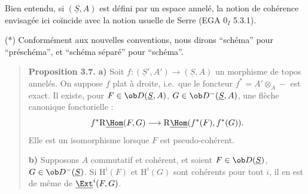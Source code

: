 Bien entendu, si $(\underline{S}, A)$ est défini par un espace annelé, la notion de cohérence envisagée ici coïncide avec la notion usuelle de Serre (EGA $0_I$ 5.3.1).

(*) Conformément aux nouvelles conventions, nous dirons ``schéma'' pour ``préschéma'', et ``schéma séparé'' pour ``schéma''.

\begin{quote}
\textbf{Proposition 3.7.} \textbf{a)} Soit $f : (\underline{S}', A') \to (\underline{S}, A)$ un morphisme de topos annelés. On suppose $f$ plat à droite, i.e.\ que le foncteur $f^* = A' \otimes_A -$ est exact. Il existe, pour $F \in \ob D(\underline{S}, A)$, $G \in \ob D^-(\underline{S}, A)$, une flèche canonique fonctorielle :
\[
f^* \mathrm{R}\underline{\Hom}(F, G) \longrightarrow \mathrm{R}\underline{\Hom}(f^*(F), f^*(G)).
\]
Elle est un isomorphisme lorsque $F$ est pseudo-cohérent.

\textbf{b)} Supposons $A$ commutatif et cohérent, et soient $F \in \ob D(\underline{S})$, $G \in \ob D^-(\underline{S})$. Si $\mathrm{H}^i(F)$ et $\mathrm{H}^i(G)$ sont cohérents pour tout $i$, il en est de même de $\underline{\Ext}^i(F, G)$.
\end{quote}

